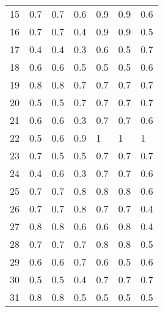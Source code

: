 \begin{table}[]
\begin{tabular}{l|lll|lll}
15              & 0.7                  & 0.7       & 0.6     & 0.9     & 0.9 & 0.6     \\
16              & 0.7                  & 0.7       & 0.4     & 0.9     & 0.9 & 0.5     \\
17              & 0.4                  & 0.4       & 0.3     & 0.6     & 0.5 & 0.7     \\
18              & 0.6                  & 0.6       & 0.5     & 0.5     & 0.5 & 0.6     \\
19              & 0.8                  & 0.8       & 0.7     & 0.7     & 0.7 & 0.7     \\
20              & 0.5                  & 0.5       & 0.7     & 0.7     & 0.7 & 0.7     \\
21              & 0.6                  & 0.6       & 0.3     & 0.7     & 0.7 & 0.6     \\
22              & 0.5                  & 0.6       & 0.9     & 1       & 1   & 1       \\
23              & 0.7                  & 0.5       & 0.5     & 0.7     & 0.7 & 0.7     \\
24              & 0.4                  & 0.6       & 0.3     & 0.7     & 0.7 & 0.6     \\
25              & 0.7                  & 0.7       & 0.8     & 0.8     & 0.8 & 0.6     \\
26              & 0.7                  & 0.7       & 0.8     & 0.7     & 0.7 & 0.4     \\
27              & 0.8                  & 0.8       & 0.6     & 0.6     & 0.8 & 0.4     \\
28              & 0.7                  & 0.7       & 0.7     & 0.8     & 0.8 & 0.5     \\
29              & 0.6                  & 0.6       & 0.7     & 0.6     & 0.5 & 0.6     \\
30              & 0.5                  & 0.5       & 0.4     & 0.7     & 0.7 & 0.7     \\
31              & 0.8                  & 0.8       & 0.5     & 0.5     & 0.5 & 0.5     \\
\end{tabular}
\end{table}
\clearpage
